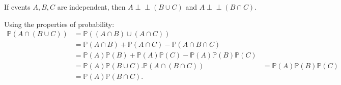 \documentclass{huhtakm-template-book-v2}
\newcommand{\independent}{\perp\!\!\!\perp}
\newcommand{\prob}{\mathbb{P}}
\begin{document}
    \begin{prop}
        If events $A,B,C$ are independent, then $A \independent (B\cup C)$ and $A \independent (B\cap C)$.
    \end{prop}
    \begin{proofing}
        Using the properties of probability:
        \begin{align*}
            \prob(A\cap(B\cup C)) &= \prob((A\cap B)\cup(A\cap C))\\
            &= \prob(A\cap B)+\prob(A\cap C)-\prob(A\cap B\cap C)\\
            &= \prob(A)\prob(B)+\prob(A)\prob(C)-\prob(A)\prob(B)\prob(C)\\
            &= \prob(A)\prob(B\cup C).
            \prob(A\cap(B\cap C)) &= \prob(A)\prob(B)\prob(C)\\
            &= \prob(A)\prob(B\cap C).
        \end{align*}
    \end{proofing}
    \newpage
\end{document}
